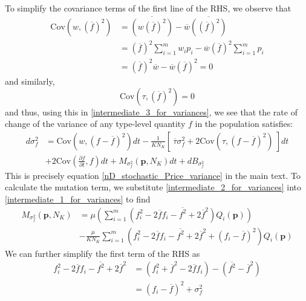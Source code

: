 To simplify the covariance terms of the first line of the RHS, we observe that
\begin{align*}
\textrm{Cov}\left(w, {\left(\overline{f}\right)}^2\right) &= \overline{\left(w{\left(\overline{f}\right)}^2\right)} - \overline{w}\overline{\left({\left(\overline{f}\right)}^2\right)}\\
&= {\left(\overline{f}\right)}^2\sum\limits_{i=1}^{m}w_ip_i - \overline{w}{\left(\overline{f}\right)}^2\sum\limits_{i=1}^{m}p_i\\
&= {\left(\overline{f}\right)}^2\overline{w} - \overline{w}{\left(\overline{f}\right)}^2 = 0
\end{align*}
and similarly,
\begin{equation*}
\textrm{Cov}\left(\tau, {\left(\overline{f}\right)}^2\right) = 0
\end{equation*}
and thus, using this in \eqref{intermediate_3_for_variances},  we see that the rate of change of the variance of any type-level quantity $f$ in the population satisfies:
\begin{equation}
\label{app_nD_stochastic_Price_variance}
\begin{aligned}
d\sigma^2_{f} &= \textrm{Cov}\left(w,(f - \overline{f})^2\right)dt - \frac{1}{KN_K}\left[ \ \overline{\tau}\sigma^2_{f} +  2\textrm{Cov}\left(\tau,(f - \overline{f})^2\right) \ \right]dt\\[12pt]
& + 2\textrm{Cov}\left(\frac{\partial f}{\partial t},f\right)dt + M_{\sigma^2_f}(\mathbf{p},N_K)dt + dB_{\sigma^2_{f}}
\end{aligned}
\end{equation}
This is precisely equation \eqref{nD_stochastic_Price_variance} in the main text. To calculate the mutation term, we substitute \eqref{intermediate_2_for_variances} into \eqref{intermediate_1_for_variances} to find
\begin{equation}
\begin{aligned}
M_{\sigma^2_f}(\mathbf{p},N_K) &= \mu\left(\sum\limits_{i=1}^{m}\left(f^2_i - 2\overline{f}f_i -\overline{f^2}+2\overline{f}^2\right)Q_i(\mathbf{p})\right)\\
&- \frac{\mu}{KN_K}\sum\limits_{i=1}^{m}\left(f^2_i - 2\overline{f}f_i -\overline{f^2}+2\overline{f}^2 + (f_i - \overline{f})^2\right)Q_i(\mathbf{p}) 
\end{aligned}
\end{equation}
We can further simplify the first term of the RHS as
\begin{align*}
f^2_i - 2\overline{f}f_i -\overline{f^2}+2\overline{f}^2 &= (f^2_i +\overline{f}^2 - 2\overline{f}f_i) - (\overline{f^2} - \overline{f}^2)\\
&= (f_i - \overline{f})^2 + \sigma^2_f
\end{align*}
